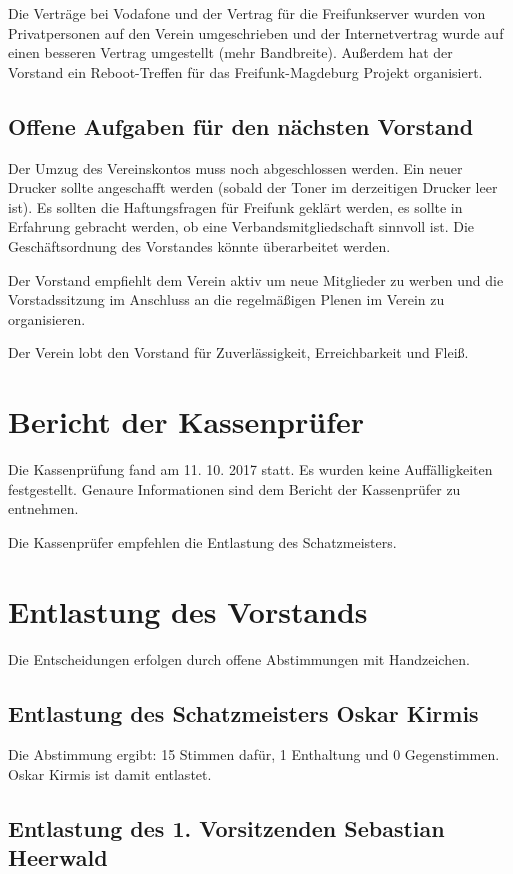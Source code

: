 \documentclass[a4paper,12pt,titlepage]{scrartcl}
\begin{document}
Die Verträge bei Vodafone und der Vertrag für die Freifunkserver wurden von Privatpersonen auf den Verein umgeschrieben und der Internetvertrag wurde auf einen besseren Vertrag umgestellt (mehr Bandbreite). Außerdem hat der Vorstand ein Reboot-Treffen für das Freifunk-Magdeburg Projekt organisiert.

\subsection{Offene Aufgaben für den nächsten Vorstand}

Der Umzug des Vereinskontos muss noch abgeschlossen werden. Ein neuer Drucker
sollte angeschafft werden (sobald der Toner im derzeitigen Drucker leer ist).
Es sollten die Haftungsfragen für Freifunk geklärt werden, es sollte in Erfahrung gebracht werden, ob eine Verbandsmitgliedschaft sinnvoll ist.
Die Geschäftsordnung des Vorstandes könnte überarbeitet werden.


Der Vorstand empfiehlt dem Verein aktiv um neue Mitglieder zu werben und die Vorstadssitzung im Anschluss an die regelmäßigen Plenen im Verein zu organisieren.

Der Verein lobt den Vorstand für Zuverlässigkeit, Erreichbarkeit und Fleiß.

\section{ Bericht der Kassenprüfer }
Die Kassenprüfung fand am 11. 10. 2017 statt. Es wurden keine Auffälligkeiten festgestellt.
Genaure Informationen sind dem Bericht der Kassenprüfer zu entnehmen.

Die Kassenprüfer empfehlen die Entlastung des Schatzmeisters.

\section{Entlastung des Vorstands}

Die Entscheidungen erfolgen durch offene Abstimmungen mit Handzeichen.

\subsection{Entlastung des Schatzmeisters Oskar Kirmis}

Die Abstimmung ergibt: 15 Stimmen dafür, 1 Enthaltung und 0 Gegenstimmen. Oskar Kirmis ist damit entlastet.

\subsection{Entlastung des 1. Vorsitzenden Sebastian Heerwald}
\end{document}

